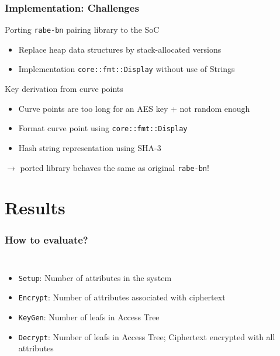 \begin{frame}[c, fragile]
    \frametitle{Implementation: Challenges}
    \begin{block}{Porting \texttt{rabe-bn} pairing library to the SoC}
        \begin{itemize}
            \item Replace heap data structures by stack-allocated versions
            \item Implementation \verb+core::fmt::Display+ without use of Strings
        \end{itemize}
    \end{block}
    \begin{block}{Key derivation from curve points}
        \begin{itemize}
            \item Curve points are too long for an AES key + not random enough
            \item Format curve point using \verb+core::fmt::Display+
            \item Hash string representation using SHA-3
        \end{itemize}
    \end{block}
    \begin{center}
        \alert{\large $\rightarrow$ ported library behaves the same as original \texttt{rabe-bn}!}
    \end{center}
\end{frame}

\section{Results}

\begin{frame}[c]
    \frametitle{How to evaluate?}
    \begin{columns}[c]
        \begin{itemize}
            \item \texttt{Setup}: Number of attributes in the system
            \item \texttt{Encrypt}: Number of attributes associated with ciphertext
            \item \texttt{KeyGen}: Number of leafs in Access Tree
            \item \texttt{Decrypt}: Number of leafs in Access Tree; Ciphertext encrypted with all attributes
        \end{itemize}

        
    \end{columns}
\end{frame}

